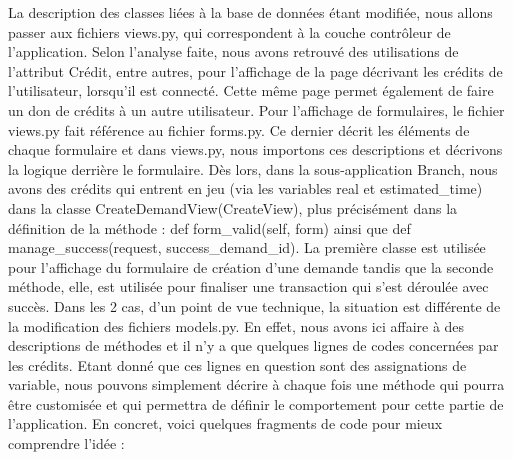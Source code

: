 La description des classes liées à la base de données étant modifiée,  nous allons passer aux fichiers views.py,  qui correspondent à la couche contrôleur de l'application.  Selon l'analyse faite,  nous avons retrouvé des utilisations de l'attribut Crédit,  entre autres,  pour l'affichage de la page décrivant les crédits de l'utilisateur,  lorsqu'il est connecté.  Cette même page permet également de faire un don de crédits à un autre utilisateur.  Pour l'affichage de formulaires,  le fichier views.py fait référence au fichier forms.py.  Ce dernier décrit les éléments de chaque formulaire et dans views.py,  nous importons ces descriptions et décrivons la logique derrière le formulaire.  Dès lors,  dans la sous-application Branch,  nous avons des crédits qui entrent en jeu (via les variables real et estimated\_time) dans la classe CreateDemandView(CreateView),  plus précisément dans la définition de la méthode : def form\_valid(self, form) ainsi que def manage\_success(request, success\_demand\_id).  La première classe est utilisée pour l'affichage du formulaire de création d'une demande tandis que la seconde méthode,  elle,  est utilisée pour finaliser une transaction qui s'est déroulée avec succès.  Dans les 2 cas,  d'un point de vue technique,  la situation est différente de la modification des fichiers models.py.  En effet,  nous avons ici affaire à des descriptions de méthodes et il n'y a que quelques lignes de codes concernées par les crédits.  Etant donné que ces lignes en question sont des assignations de variable,  nous pouvons simplement décrire à chaque fois une méthode qui pourra être customisée et qui permettra de définir le comportement pour cette partie de l'application.  En concret,  voici quelques fragments de code pour mieux comprendre l'idée : 

